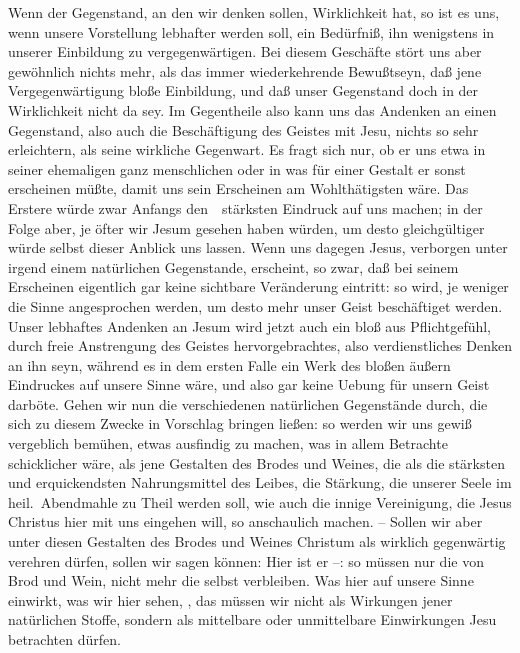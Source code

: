 \begin{aufzb}
\item Wenn der Gegenstand, an den wir denken sollen, Wirklichkeit hat, so ist es uns, wenn unsere Vorstellung lebhafter werden soll, ein Bedürfniß, ihn wenigstens in unserer Einbildung zu vergegenwärtigen. Bei diesem Geschäfte stört uns aber gewöhnlich nichts mehr, als das immer wiederkehrende Bewußtseyn, daß jene Vergegenwärtigung bloße Einbildung, und daß unser Gegenstand doch in der Wirklichkeit nicht da sey. Im Gegentheile also kann uns das Andenken an einen Gegenstand, also auch die Beschäftigung des Geistes mit Jesu, nichts so sehr erleichtern, als seine wirkliche Gegenwart. Es fragt sich nur, ob er uns etwa in seiner ehemaligen ganz menschlichen oder in was für einer Gestalt er sonst erscheinen müßte, damit uns sein Erscheinen am Wohlthätigsten wäre. Das Erstere würde zwar Anfangs den~\ stärksten Eindruck auf uns machen; in der Folge aber, je öfter wir Jesum gesehen haben würden, um desto gleichgültiger würde selbst dieser Anblick uns lassen. Wenn uns dagegen Jesus, verborgen unter irgend einem natürlichen Gegenstande, erscheint, so zwar, daß bei seinem Erscheinen eigentlich gar keine sichtbare Veränderung eintritt: so wird, je weniger die Sinne angesprochen werden, um desto mehr unser Geist beschäftiget werden. Unser lebhaftes Andenken an Jesum wird jetzt auch ein bloß aus Pflichtgefühl, durch freie Anstrengung des Geistes hervorgebrachtes, also verdienstliches Denken an ihn seyn, während es in dem ersten Falle ein Werk des bloßen äußern Eindruckes auf unsere Sinne wäre, und also gar keine Uebung für unsern Geist darböte. Gehen wir nun die verschiedenen natürlichen Gegenstände durch, die sich zu diesem Zwecke in Vorschlag bringen ließen: so werden wir uns gewiß vergeblich bemühen, etwas ausfindig zu machen, was in allem Betrachte schicklicher wäre, als jene Gestalten des Brodes und Weines, die als die stärksten und erquickendsten Nahrungsmittel des Leibes, die Stärkung, die unserer Seele im heil.\ Abendmahle zu Theil werden soll, wie auch die innige Vereinigung, die Jesus Christus hier mit uns eingehen will, so anschaulich machen. -- Sollen wir aber unter diesen Gestalten des Brodes und Weines Christum als wirklich gegenwärtig verehren dürfen, sollen wir sagen können: Hier ist er --: so müssen nur die von Brod und Wein, nicht mehr die  selbst verbleiben. Was hier auf unsere Sinne einwirkt, was wir hier sehen, \usw , das müssen wir nicht als Wirkungen jener natürlichen Stoffe, sondern als mittelbare oder unmittelbare Einwirkungen Jesu betrachten dürfen.
\end{aufzb}
